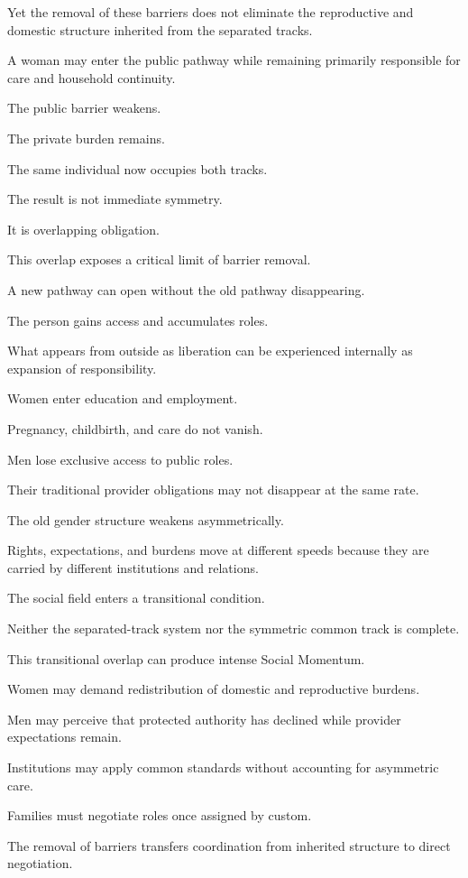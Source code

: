 Yet the removal of these barriers does not eliminate the reproductive and domestic structure inherited from the separated tracks.

A woman may enter the public pathway while remaining primarily responsible for care and household continuity.

The public barrier weakens.

The private burden remains.

The same individual now occupies both tracks.

The result is not immediate symmetry.

It is overlapping obligation.

This overlap exposes a critical limit of barrier removal.

A new pathway can open without the old pathway disappearing.

The person gains access and accumulates roles.

What appears from outside as liberation can be experienced internally as expansion of responsibility.

Women enter education and employment.

Pregnancy, childbirth, and care do not vanish.

Men lose exclusive access to public roles.

Their traditional provider obligations may not disappear at the same rate.

The old gender structure weakens asymmetrically.

Rights, expectations, and burdens move at different speeds because they are carried by different institutions and relations.

The social field enters a transitional condition.

Neither the separated-track system nor the symmetric common track is complete.

This transitional overlap can produce intense Social Momentum.

Women may demand redistribution of domestic and reproductive burdens.

Men may perceive that protected authority has declined while provider expectations remain.

Institutions may apply common standards without accounting for asymmetric care.

Families must negotiate roles once assigned by custom.

The removal of barriers transfers coordination from inherited structure to direct negotiation.

